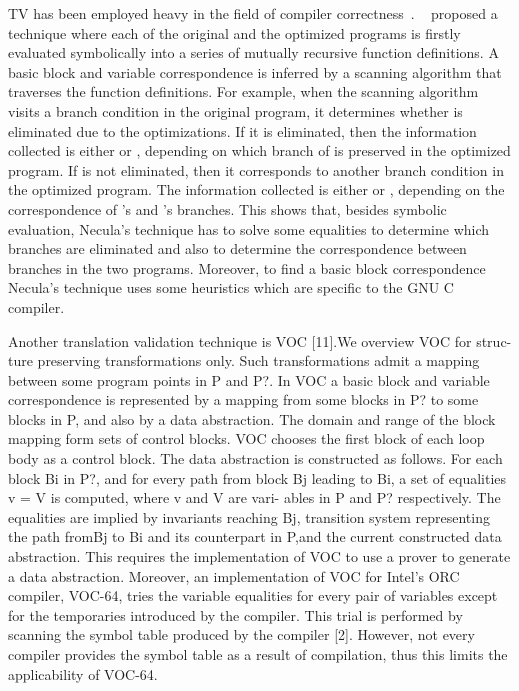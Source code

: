 TV has been employed heavy in the field of compiler correctness~\cite{VOC2002,TVOC:CAV2005,Necula:2000}.
~\cite{Necula:2000} proposed a technique where each of the original and the optimized programs is firstly evaluated symbolically
into a series of mutually recursive function definitions. A basic block and variable correspondence is inferred by a scanning algorithm that traverses the function definitions.
For example, when the scanning algorithm visits a branch condition  in the original
program, it determines whether  is eliminated due to the optimizations. If it is eliminated, then the information collected is either  or , depending on which branch of  is preserved in the optimized program. 
%
If  is not eliminated, then it corresponds to another branch condition  in the optimized program. The information collected is either  or , depending on the correspondence of ’s and ’s branches. This shows that, besides symbolic evaluation, Necula’s technique has to
solve some equalities to determine which branches are eliminated and also to determine
the correspondence between branches in the two programs. Moreover, to find a basic
block correspondence Necula’s technique uses some heuristics which are specific to the
GNU C compiler.
  
Another translation validation technique is VOC [11].We overview VOC for struc-
ture preserving transformations only. Such transformations admit a mapping between some program points in P and P?. In VOC a basic block and variable correspondence is represented by a mapping from some blocks in P? to some blocks in P, and also by a data abstraction. The domain and range of the block mapping form sets of control blocks. VOC chooses the first block of each loop body as a control block. The data abstraction is constructed as follows. For each block Bi in P?, and for every path from block Bj leading to Bi, a set of equalities v = V is computed, where v and V are vari- ables in P and P? respectively. The equalities are implied by invariants reaching Bj, transition system representing the path fromBj to Bi and its counterpart in P,and the current constructed data abstraction. This requires the implementation of VOC to use a
prover to generate a data abstraction. Moreover, an implementation of VOC for Intel’s ORC compiler, VOC-64, tries the variable equalities for every pair of variables except for the temporaries introduced by the compiler. This trial is performed by scanning the symbol table produced by the compiler [2]. However, not every compiler provides the symbol table as a result of compilation, thus this limits the applicability of VOC-64.
  
